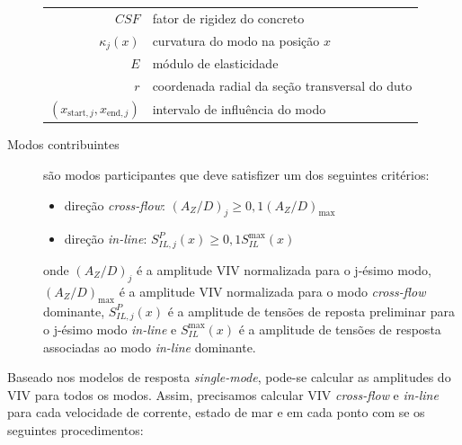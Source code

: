\begin{description}
    \begin{tabular}{rl}
        $\mathit{CSF}$                            & fator de rigidez do concreto\\
        $\kappa_{j}(x)$                           & curvatura do modo na posição $x$\\
        $E$                                       & módulo de elasticidade\\
        $r$                                       & coordenada radial da seção transversal do duto\\
        $(x_{\text{start},j}, x_{\text{end}, j})$ & intervalo de influência do modo
    \end{tabular}

	\item [Modos contribuintes] são modos participantes que deve satisfizer um dos seguintes critérios:

        \begin{itemize}
    	\item direção \textit{cross-flow}: ${(A_Z/D)}_j \geq 0,1{(A_Z/D)}_{\max}$

        \item direção \textit{in-line}: $S_{\mathit{IL}, \mathit{j}}^{P}(x) \geq 0,1 S_\mathit{IL}^{\max}(x)$
        \end{itemize}

	onde ${(A_Z/D)}_j$ é a amplitude VIV normalizada para o j-ésimo modo, ${(A_Z/D)}_{\max}$ é a amplitude VIV normalizada para o modo \textit{cross-flow}  dominante, $S_{\mathit{IL}, \mathit{j}}^{P}(x)$ é a amplitude de tensões de reposta preliminar para o j-ésimo modo \textit{in-line} e $S_\mathit{IL}^{\max}(x)$ é a amplitude de tensões de resposta associadas ao modo \textit{in-line} dominante.

\end{description}

Baseado nos modelos de resposta \textit{single-mode}, pode-se calcular as amplitudes do VIV para todos os modos.
Assim, precisamos calcular VIV \textit{cross-flow} e \textit{in-line} para cada velocidade de corrente, estado de mar e em cada ponto com se os seguintes procedimentos:

